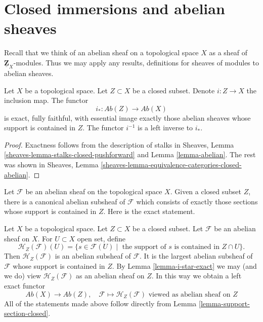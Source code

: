 \section{Closed immersions and abelian sheaves}
\label{section-closed-immersions}

\noindent
Recall that we think of an abelian sheaf on a topological space $X$ as a
sheaf of $\underline{\mathbf{Z}}_X$-modules. Thus we may apply any results,
definitions for sheaves of modules to abelian sheaves.

\begin{lemma}
\label{lemma-i-star-exact}
Let $X$ be a topological space. Let $Z \subset X$ be a closed subset.
Denote $i : Z \to X$ the inclusion map. The functor
$$
i_* : \textit{Ab}(Z) \longrightarrow \textit{Ab}(X)
$$
is exact, fully faithful, with essential image exactly those
abelian sheaves whose support is contained in $Z$. The functor $i^{-1}$
is a left inverse to $i_*$.
\end{lemma}

\begin{proof}
Exactness follows from the description of
stalks in Sheaves, Lemma \ref{sheaves-lemma-stalks-closed-pushforward}
and Lemma \ref{lemma-abelian}. The rest was shown in
Sheaves, Lemma \ref{sheaves-lemma-equivalence-categories-closed-abelian}.
\end{proof}

\noindent
Let $\mathcal{F}$ be an abelian sheaf on the topological space $X$. Given
a closed subset $Z$, there is a canonical abelian subsheaf of $\mathcal{F}$
which consists of exactly those sections whose support is contained in $Z$.
Here is the exact statement.

\begin{remark}
\label{remark-sections-support-in-closed}
Let $X$ be a topological space. Let $Z \subset X$ be a closed subset.
Let $\mathcal{F}$ be an abelian sheaf on $X$. For $U \subset X$ open set, define
$$
\mathcal{H}_Z(\mathcal{F})(U) =
\{s \in \mathcal{F}(U) \mid
\text{ the support of }s\text{ is contained in }Z \cap U\}.
$$
Then $\mathcal{H}_Z(\mathcal{F})$ is an abelian subsheaf of $\mathcal{F}$.
It is the largest abelian subsheaf of $\mathcal{F}$ whose support is
contained in $Z$. By Lemma \ref{lemma-i-star-exact} we may (and we do)
view $\mathcal{H}_Z(\mathcal{F})$ as an abelian sheaf on $Z$.
In this way we obtain a left exact functor
$$
\textit{Ab}(X) \longrightarrow \textit{Ab}(Z),\quad
\mathcal{F} \longmapsto \mathcal{H}_Z(\mathcal{F})
\text{ viewed as abelian sheaf on }Z
$$
All of the statements made above follow directly from
Lemma \ref{lemma-support-section-closed}.
\end{remark}

